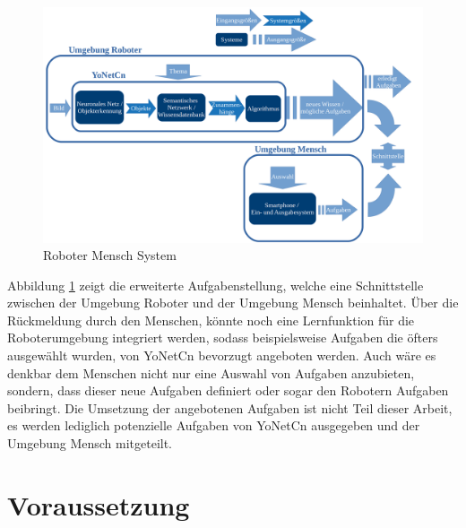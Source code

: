 \begin{figure}[h]
	
	\begin{center}
		
		\includegraphics[width=16cm]{images/Masteridee_3.png}
		
		\caption{Roboter Mensch System}
		
		\label{Roboter_Mensch_System}
		
	\end{center}
	
	
\end{figure}


Abbildung \ref{Roboter_Mensch_System} zeigt die erweiterte Aufgabenstellung, welche eine Schnittstelle zwischen der Umgebung Roboter und der Umgebung Mensch beinhaltet. 
Über die Rückmeldung durch den Menschen, könnte noch eine Lernfunktion für die Roboterumgebung integriert werden, sodass beispielsweise Aufgaben die öfters ausgewählt wurden, von YoNetCn bevorzugt angeboten werden. Auch wäre es denkbar dem Menschen nicht nur eine Auswahl von Aufgaben anzubieten, sondern, dass dieser neue Aufgaben definiert oder sogar den Robotern Aufgaben beibringt. 
Die Umsetzung der angebotenen Aufgaben ist nicht Teil dieser Arbeit, es werden lediglich potenzielle Aufgaben von YoNetCn ausgegeben und der Umgebung Mensch mitgeteilt. 





\section{Voraussetzung}
\label{sec:voraussetzung}





